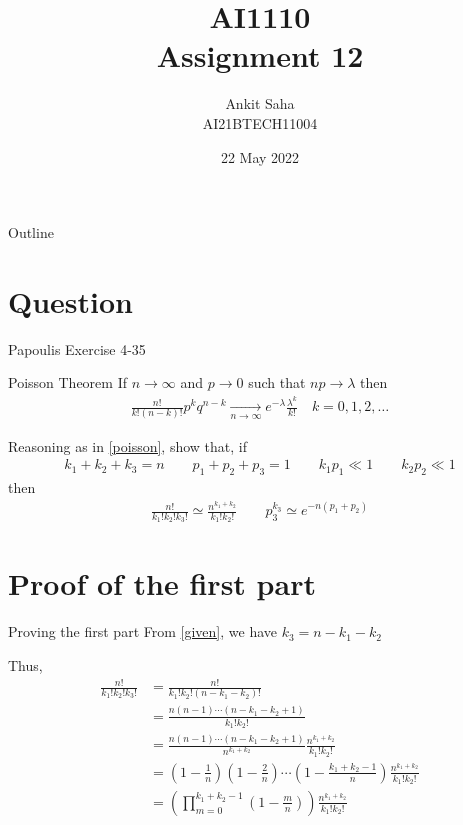 \documentclass{beamer}
\title{AI1110 \\ Assignment 12}
\author{Ankit Saha \\ AI21BTECH11004}
\date{22 May 2022}
\providecommand{\brak}[1]{\ensuremath{\left(#1\right)}}
\begin{document}
	\begin{frame}
		\titlepage
	\end{frame}
	
	\begin{frame}{Outline}
    		\tableofcontents
	\end{frame}
	
	\section{Question}
	\begin{frame}{Papoulis Exercise 4-35}
	\begin{block}{Poisson Theorem}
		If $n \to \infty$ and $p \to 0$ such that $np \to \lambda$ then 
		\begin{align}
			\label{poisson}
			\frac{n!}{k! (n-k)!} p^k q^{n-k} \xrightarrow[n \to \infty]{} e^{-\lambda} \frac{\lambda^k}{k!} \quad k = 0,1,2,\ldots
		\end{align}
	\end{block}
	
	Reasoning as in \eqref{poisson}, show that, if
	\begin{align}
		\label{given}
		k_1 + k_2 + k_3 = n \qquad p_1 + p_2 + p_3 = 1 \qquad k_1 p_1 \ll 1 \qquad k_2 p_2 \ll 1
	\end{align}
	then
	\begin{align}
		\frac{n!}{k_1! k_2! k_3!} \simeq \frac{n^{k_1 + k_2}}{k_1! k_2!} \qquad p_3^{k_3} \simeq e^{-n(p_1 + p_2)}
	\end{align}
	\end{frame}
	
	\section{Proof of the first part}
	\begin{frame}{Proving the first part}
	From \eqref{given}, we have $k_3 = n - k_1 - k_2$
	
	Thus,
	\begin{align}
		\frac{n!}{k_1! k_2! k_3!} &= \frac{n!}{k_1! k_2! (n - k_1 - k_2)!} \\
		&= \frac{n(n-1) \cdots (n - k_1 - k_2 + 1)}{k_1! k_2!} \\
		&= \frac{n(n-1) \cdots (n - k_1 - k_2 + 1)}{n^{k_1 + k_2}} \frac{n^{k_1 + k_2}}{k_1! k_2!} \\
		&= \brak{1-\frac1n} \brak{1-\frac2n} \cdots \brak{1-\frac{k_1 + k_2 - 1}{n}} \frac{n^{k_1 + k_2}}{k_1! k_2!} \\
		&= \brak{\prod_{m=0}^{k_1 + k_2 - 1} \brak{1 - \frac{m}{n}}} \frac{n^{k_1 + k_2}}{k_1! k_2!}
	\end{align}
	\end{frame}
		
\end{document}
